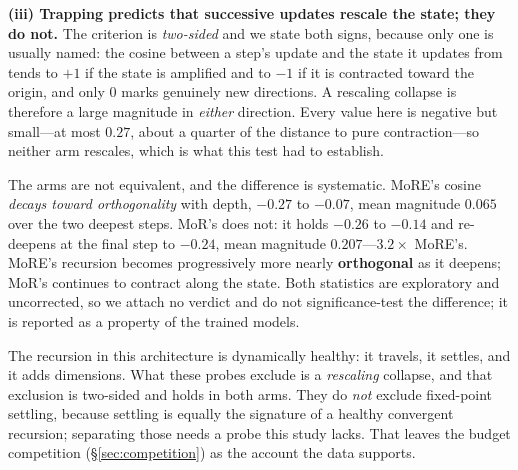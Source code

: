 \textbf{(iii) Trapping predicts that successive updates rescale the state; they
do not.} The criterion is \emph{two-sided} and we state both signs, because only
one is usually named: the cosine between a step's update and the state it updates
from tends to $+1$ if the state is amplified and to $-1$ if it is contracted
toward the origin, and only $0$ marks genuinely new directions. A rescaling
collapse is therefore a large magnitude in \emph{either} direction. Every value
here is negative but small---at most $0.27$, about a quarter of the distance to
pure contraction---so neither arm rescales, which is what this test had to
establish.

The arms are not equivalent, and the difference is systematic. MoRE's cosine
\emph{decays toward orthogonality} with depth, $-0.27$ to $-0.07$, mean magnitude
$0.065$ over the two deepest steps. MoR's does not: it holds $-0.26$ to $-0.14$
and re-deepens at the final step to $-0.24$, mean magnitude $0.207$---$3.2\times$
MoRE's. MoRE's recursion becomes progressively more nearly \textbf{orthogonal} as
it deepens; MoR's continues to contract along the state. Both statistics are
exploratory and uncorrected, so we attach no verdict and do not significance-test
the difference; it is reported as a property of the trained models.

The recursion in this architecture is dynamically healthy: it travels, it settles,
and it adds dimensions. What these probes exclude is a \emph{rescaling} collapse,
and that exclusion is two-sided and holds in both arms. They do \emph{not} exclude
fixed-point settling, because settling is equally the signature of a healthy
convergent recursion; separating those needs a probe this study lacks. That leaves
the budget competition (\S\ref{sec:competition}) as the account the data supports.

